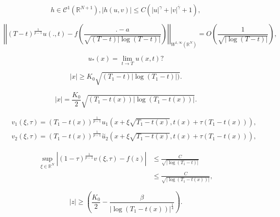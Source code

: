 \documentclass[10pt,a4paper]{amsart}
\newcommand{\R}{\numberset{R}}
\newcommand{\numberset}{\mathbb}
\begin{document}
\begin{equation}\label{condition h}
h\in \mathcal{C}^1(\R^{N+1}), |h(u,v)|\leq C(|u|^{\gamma}+|v|^{\overline{\gamma}}+1),
\end{equation}

\begin{equation}\label{behaviour1}
\left|\left|(T-t)^{\frac{1}{p-1}}u(.,t)-f\left(\frac{.-a}{\sqrt{(T-t)|\log(T-t)|}}\right)\right|\right|_{W^{1,\infty}(\R^N)}=O\left(\frac{1}{\sqrt{|\log(T-t)|}}\right),
\end{equation}

\begin{equation}\label{u_*}
u_*(x)=\underset{t\rightarrow T}{\lim}u(x,t)?
\end{equation}

\begin{equation}\label{region outside}
|x|\geq K_0\sqrt{(T_1-t)|\log(T_1-t)|)}.
\end{equation}

\begin{equation}\label{def t(x)}
|x|= \frac{K_0}{2}\sqrt{(T_1-t(x))|\log (T_1-t(x))|}.
\end{equation}

\begin{equation}\label{def: v}
\begin{split}
&v_1(\xi,\tau)=(T_1-t(x))^{\frac{1}{p-1}}u_1(x+\xi\sqrt{T_1-t(x)},t(x)+\tau (T_1-t(x))),\\
&v_2(\xi,\tau)=(T_1-t(x))^{\frac{1}{p-1}}\overset{\sim}{u}_2(x+\xi\sqrt{T_1-t(x)},t(x)+\tau (T_1-t(x))),
\end{split}
\end{equation}

\begin{equation}\label{profile v}
\begin{split}
\underset{\xi\in \R^N}{\sup}\left|(1-\tau)^{\frac{1}{p-1}}v(\xi,\tau)-f\left(z\right)\right|&\leq \frac{C}{\sqrt{|\log(T_1-t)|}}\\
&\leq \frac{C}{\sqrt{|\log(T_1-t(x))|}},
\end{split}
\end{equation}

\begin{equation}\label{z > K_0 beta}
|z|\geq \left(\frac{K_0}{2}-\frac{\beta}{|\log(T_1-t(x))|^{\frac{1}{4}}}\right).
\end{equation}
\end{document}
